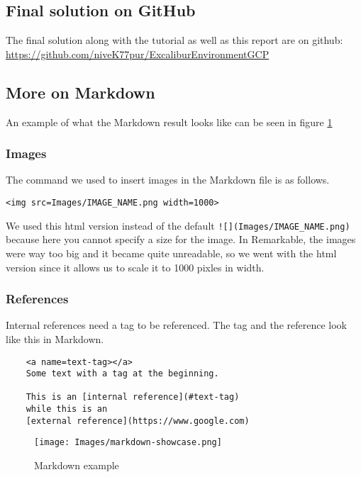 \subsection{Final solution on GitHub}\label{app:github}

The final solution along with the tutorial as well as this report are
on github: \url{https://github.com/niveK77pur/ExcaliburEnvironmentGCP}

\subsection{More on Markdown}\label{app:markdown}

An example of what the Markdown result looks like can be seen in
figure \ref{fig:markdown}

\subsubsection{Images}

The command we used to insert
images in the Markdown file is as follows.

\begin{verbatim}
<img src=Images/IMAGE_NAME.png width=1000>
\end{verbatim}

We used this html version instead of the default
\verb|![](Images/IMAGE_NAME.png)| because here you cannot specify a
size for the image. In Remarkable, the images were way too big and it
became quite unreadable, so we went with the html version since it
allows us to scale it to 1000 pixles in width.

\subsubsection{References}

Internal references need a tag to be
referenced. The tag and the reference look like this in Markdown.

\begin{verbatim}
	<a name=text-tag></a>
	Some text with a tag at the beginning.

	This is an [internal reference](#text-tag)
	while this is an
	[external reference](https://www.google.com)
\end{verbatim}

\begin{figure}
	\centering
	\texttt{[image: Images/markdown-showcase.png]}
	\caption{Markdown example}
	\label{fig:markdown}
\end{figure}

